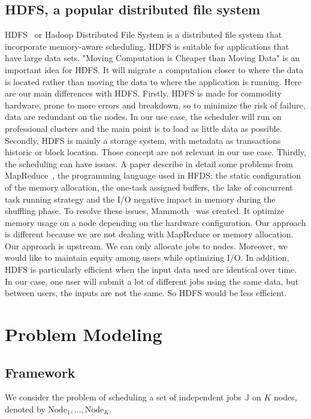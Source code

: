 \documentclass[a4paper]{article}
\newcommand{\Node}[1]{\ensuremath{\mathrm{Node}_{#1}}\xspace}
\newcommand{\jobset}{\ensuremath{\mathbb{J}}\xspace}
\begin{document}
\subsection{HDFS, a popular distributed file system}
HDFS~\cite{hdfs} or Hadoop Distributed File System is a distributed file system that incorporate memory-aware scheduling.
HDFS is suitable for applications that have large data sets. 
"Moving Computation is Cheaper than Moving Data" is an important idea for HDFS.
It will migrate a computation closer to where the data is located rather than moving the data to where
the application is running.
Here are our main differences with HDFS. Firstly, HDFS is made for commodity hardware, prone
to more errors and breakdown, so to minimize the risk of failure, data are redundant on the nodes.
In our use case, the scheduler will run on professional clusters and the main point is to load as 
little data as possible. Secondly, HDFS is mainly a storage system, with metadata as transactions historic or
block location. Those concept are not relevant in our use case. Thirdly, the scheduling 
can have issues. A paper describe in detail some problems from MapReduce~\cite{issue_with_hdfs}, the
programming language used in HFDS: the static configuration of the memory allocation, the one-task assigned buffers, the
lake of concurrent task running strategy and the I/O negative impact in memory during the shuffling phase.
To resolve these issues, Mammoth~\cite{Mammoth} was created. It optimize memory usage on a node depending on the hardware configuration.
Our approach is different because we are not dealing with MapReduce or memory allocation.
Our approach is upstream. We can only allocate jobs to nodes. Moreover, we would like to maintain
equity among users  while optimizing I/O.
In addition, HDFS is particularly efficient when the input data used are identical over time.
In our case, one user will submit a lot of different jobs using the same data, but between users,
the inputs are not the same. So HDFS would be less efficient.


\section{Problem Modeling}

\subsection{Framework}

We consider the problem of scheduling a set of independent jobs $\jobset$ on $K$ nodes,
denoted by $\Node{1},\ldots, \Node{K}$.
\end{document}
